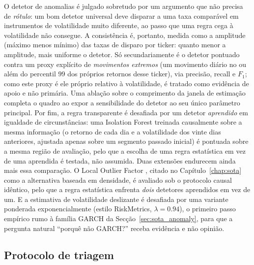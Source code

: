 O detetor de anomalias é julgado sobretudo por um argumento que não precisa de \emph{rótulo}: um bom detetor
universal deve disparar a uma taxa comparável em instrumentos de volatilidade muito diferente, ao passo que
uma regra cega à volatilidade não consegue. A consistência é, portanto, medida como a amplitude (máximo
menos mínimo) das taxas de disparo por ticker: quanto menor a amplitude, mais uniforme o detetor. Só
secundariamente é o detetor pontuado contra um proxy explícito de \emph{movimentos extremos} (um movimento
diário no ou além do percentil $99$ dos próprios retornos desse ticker), via precisão, recall e $F_1$; como
este proxy é ele próprio relativo à volatilidade, é tratado como evidência de apoio e não primária. Uma
ablação sobre o comprimento da janela de estimação completa o quadro ao expor a sensibilidade do detetor ao
seu único parâmetro principal. Por fim, a regra transparente é desafiada por um detetor \emph{aprendido} em
igualdade de circunstâncias: uma Isolation Forest \autocite{liu2008isolation} treinada causalmente sobre a
mesma informação (o retorno de cada dia e a volatilidade dos vinte dias anteriores, ajustada apenas sobre um
segmento passado inicial) é pontuada sobre a mesma região de avaliação, pelo que a escolha de uma regra
estatística em vez de uma aprendida é testada, não assumida. Duas extensões endurecem ainda mais essa
comparação. O Local Outlier Factor \autocite{breunig2000lof}, citado no Capítulo~\ref{chap:sota} como a
alternativa baseada em densidade, é avaliado sob o protocolo causal idêntico, pelo que a regra estatística
enfrenta \emph{dois} detetores aprendidos em vez de um. E a estimativa de volatilidade deslizante é desafiada
por uma variante ponderada exponencialmente (estilo RiskMetrics, $\lambda = 0.94$), o primeiro passo
empírico rumo à família GARCH da Secção~\ref{sec:sota_anomaly}, para que a pergunta natural ``porquê não
GARCH?'' receba evidência e não opinião.

\subsection{Protocolo de triagem}
\label{sec:met_eval_triage}

